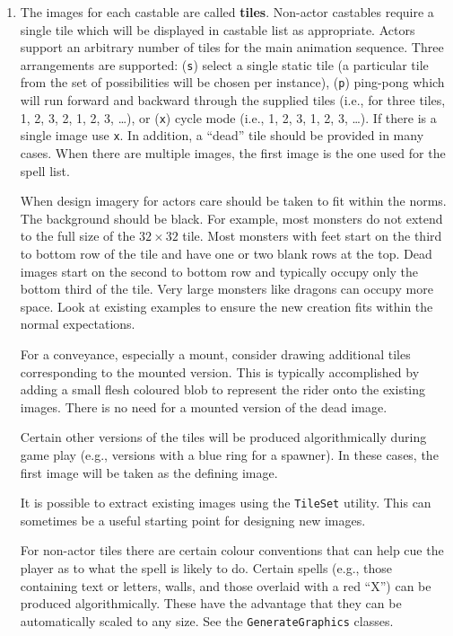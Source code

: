 \documentclass{article}
\begin{document}
\begin{enumerate}

\item The images for each castable are called {\bf tiles}. Non-actor castables require a single tile which will be displayed in castable list as appropriate. Actors support an arbitrary number of tiles for the main animation sequence. Three arrangements are supported: ({\tt s}) select a single static tile (a particular tile from the set of possibilities will be chosen per instance), ({\tt p}) ping-pong which will run forward and backward through the supplied tiles (i.e., for three tiles, 1, 2, 3, 2, 1, 2, 3, \ldots), or ({\tt x}) cycle mode (i.e., 1, 2, 3, 1, 2, 3, \ldots).  If there is a single image use {\tt x}. In addition, a ``dead'' tile should be provided in many cases. When there are multiple images, the first image is the one used for the spell list.

  When design imagery for actors care should be taken to fit within the norms.  The background should be black. For example, most monsters do not extend to the full size of the $32\times32$ tile.  Most monsters with feet start on the third to bottom row of the tile and have one or two blank rows at the top. Dead images start on the second to bottom row and typically occupy only the bottom third of the tile. Very large monsters like dragons can occupy more space. Look at existing examples to ensure the new creation fits within the normal expectations.

  For a conveyance, especially a mount, consider drawing additional tiles corresponding to the mounted version.  This is typically accomplished by adding a small flesh coloured blob to represent the rider onto the existing images. There is no need for a mounted version of the dead image.

  Certain other versions of the tiles will be produced algorithmically during game play (e.g., versions with a blue ring for a spawner). In these cases, the first image will be taken as the defining image.

  It is possible to extract existing images using the {\tt TileSet} utility. This can sometimes be a useful starting point for designing new images.

  For non-actor tiles there are certain colour conventions that can help cue the player as to what the spell is likely to do.  Certain spells (e.g., those containing text or letters, walls, and those overlaid with a red ``X'') can be produced algorithmically. These have the advantage that they can be automatically scaled to any size. See the {\tt GenerateGraphics} classes.


\end{enumerate}
\end{document}
